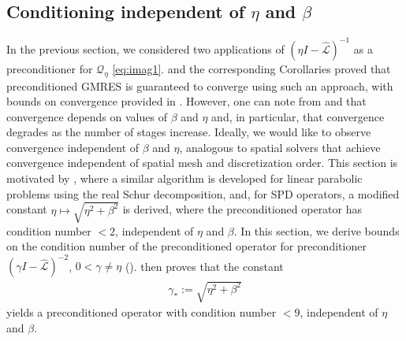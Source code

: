 \documentclass[review]{siamart}
\begin{document}
\subsection{Conditioning independent of $\eta$ and $\beta$}\label{sec:solve:gamma}

In the previous section, we considered two applications of $(\eta I -
\widehat{\mathcal{L}})^{-1}$ as a preconditioner for $\mathcal{Q}_\eta$ \eqref{eq:imag1}.
 and the corresponding Corollaries proved that preconditioned
GMRES is guaranteed to converge using such an approach, with bounds on convergence
provided in . However, one can note from  and
 that convergence depends on values of $\beta$ and $\eta$ and, in
particular, that convergence degrades as the number of stages increase. Ideally,
we would like to observe convergence independent of $\beta$ and $\eta$, analogous
to spatial solvers that achieve convergence independent of spatial mesh and
discretization order. This section is motivated by \cite{exh}, where a similar
algorithm is developed for linear parabolic problems using the real Schur
decomposition, and, for SPD operators, a modified constant $\eta \mapsto
\sqrt{\eta^2+\beta^2}$ is derived, where the preconditioned operator has
condition number $<2$, independent of $\eta$ and $\beta$. In this section,
we derive bounds on the condition number of the preconditioned operator for
preconditioner $(\gamma I - \widehat{\mathcal{L}})^{-2}$, $0 < \gamma\neq \eta$
().  then proves that the constant
%
\begin{align}\label{eq:gam_opt}
\gamma _* := \sqrt{\eta^2+\beta^2}
\end{align}
%
yields a preconditioned operator with condition number $<9$, independent
of $\eta$ and $\beta$.
\end{document}
